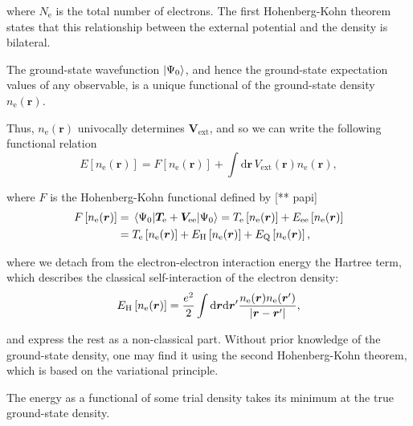 where \(N_{\mathrm{e}}\) is the total number of electrons. The first Hohenberg-Kohn theorem states that this relationship between the external potential and the density is bilateral.

\begin{theorem}
The ground-state wavefunction \(\ket{\Psi_0}\), and hence the ground-state expectation values of any observable, is a unique functional of the ground-state density \(n_{\mathrm e}(\bm{r})\).
\end{theorem}

Thus, \(n_{\mathrm e}(\bm r)\) univocally determines \(\bm V_{\mathrm{ext}}\), and so we can write the following functional relation
\begin{equation}
	\label{en-fal}
	E\left[n_{\mathrm{e}}(\bm{r})\right]=F\left[n_{\mathrm{e}}(\bm{r})\right]+\int\mathrm{d} \bm{r}\, V_{\mathrm{ext}}(\bm{r}) n_{\mathrm{e}}(\bm{r}),
\end{equation}

where \(F\) is the Hohenberg-Kohn functional defined by [** papi]
\begin{equation}
\begin{split}
F\left[n_{\mathrm{e}}(\bm{r})\right]&=\expval{\bm T_{\mathrm e}+\bm V_{\mathrm{ee}}}{\Psi_0}=T_{\mathrm e}\left[n_{\mathrm{e}}(\bm{r})\right]+E_{\mathrm{ee}}\left[n_{\mathrm{e}}(\bm{r})\right]\\
&=T_{\mathrm e}\left[n_{\mathrm{e}}(\bm{r})\right]+E_{\mathrm{H}}\left[n_{\mathrm{e}}(\bm{r})\right]+E_{\mathrm{Q}}\left[n_{\mathrm{e}}(\bm{r})\right],
\end{split}
\end{equation}

where we detach from the electron-electron interaction energy the Hartree term, which describes the classical self-interaction of the electron density:
\begin{equation}
E_{\mathrm{H}}\left[n_{\mathrm{e}}(\bm{r})\right]=\frac {e^2} 2 \int\mathrm{d}\bm r\mathrm{d}\bm{r}'\frac{n_{\mathrm{e}}(\bm{r})n_{\mathrm{e}}(\bm{r}')}{\abs{\bm{r} - \bm{r}'}},
\end{equation}

and express the rest as a non-classical part. Without prior knowledge of the ground-state density, one may find it using the second Hohenberg-Kohn theorem, which is based on the variational principle.

\begin{theorem}
The energy as a functional of some trial density takes its minimum at the true ground-state density.
\end{theorem}

